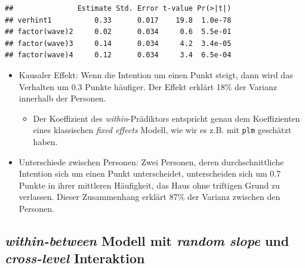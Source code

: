 \documentclass[
]{book}
\newenvironment{Shaded}{\begin{snugshade}}{\end{snugshade}}
\newcommand{\CommentTok}[1]{\textcolor[rgb]{0.56,0.35,0.01}{\textit{#1}}}
\newcommand{\DataTypeTok}[1]{\textcolor[rgb]{0.13,0.29,0.53}{#1}}
\newcommand{\KeywordTok}[1]{\textcolor[rgb]{0.13,0.29,0.53}{\textbf{#1}}}
\newcommand{\NormalTok}[1]{#1}
\newcommand{\OperatorTok}[1]{\textcolor[rgb]{0.81,0.36,0.00}{\textbf{#1}}}
\newcommand{\StringTok}[1]{\textcolor[rgb]{0.31,0.60,0.02}{#1}}
\providecommand{\tightlist}{%
  \setlength{\itemsep}{0pt}\setlength{\parskip}{0pt}}
\begin{document}
\begin{Shaded}
\end{Shaded}

\begin{verbatim}
##               Estimate Std. Error t-value Pr(>|t|)
## verhint1          0.33      0.017    19.8  1.0e-78
## factor(wave)2     0.02      0.034     0.6  5.5e-01
## factor(wave)3     0.14      0.034     4.2  3.4e-05
## factor(wave)4     0.12      0.034     3.4  6.5e-04
\end{verbatim}

\begin{itemize}
\tightlist
\item
  Kausaler Effekt: Wenn die Intention um einen Punkt steigt, dann wird das Verhalten um 0.3 Punkte häufiger. Der Effekt erklärt 18\% der Varianz innerhalb der Personen.

  \begin{itemize}
  \tightlist
  \item
    Der Koeffizient des \emph{within}-Prädiktors entspricht genau dem Koeffizienten eines klassischen \emph{fixed effects} Modell, wie wir es z.B. mit \texttt{plm} geschätzt haben.
  \end{itemize}
\item
  Unterschiede zwischen Personen: Zwei Personen, deren durchschnittliche Intention sich um einen Punkt unterscheidet, unterscheiden sich um 0.7 Punkte in ihrer mittleren Häufigkeit, das Haus ohne triftigen Grund zu verlassen. Dieser Zusammenhang erklärt 87\% der Varianz zwischen den Personen.
\end{itemize}

\hypertarget{within-between-modell-mit-random-slope-und-cross-level-interaktion}{%
\subsection*{\texorpdfstring{\emph{within-between} Modell mit \emph{random slope} und \emph{cross-level} Interaktion}{within-between Modell mit random slope und cross-level Interaktion}}\label{within-between-modell-mit-random-slope-und-cross-level-interaktion}}
\end{document}
